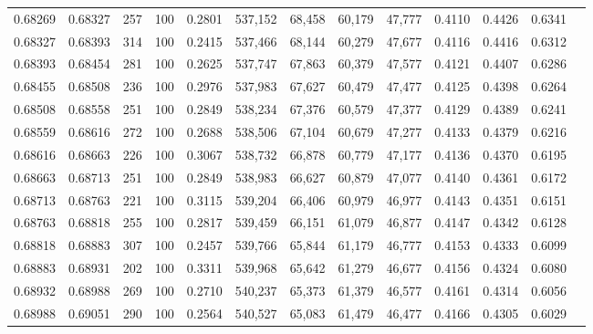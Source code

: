 \begin{tabular}{rrrrrrrrrrrrr}
0.68269 & 0.68327 &   257 & 100 &                                     0.2801 & 537,152 &  68,458 &  60,179 &  47,777 & 0.4110 & 0.4426 & 0.6341 \\
0.68327 & 0.68393 &   314 & 100 &                                     0.2415 & 537,466 &  68,144 &  60,279 &  47,677 & 0.4116 & 0.4416 & 0.6312 \\
0.68393 & 0.68454 &   281 & 100 &                                     0.2625 & 537,747 &  67,863 &  60,379 &  47,577 & 0.4121 & 0.4407 & 0.6286 \\
0.68455 & 0.68508 &   236 & 100 &                                     0.2976 & 537,983 &  67,627 &  60,479 &  47,477 & 0.4125 & 0.4398 & 0.6264 \\
0.68508 & 0.68558 &   251 & 100 &                                     0.2849 & 538,234 &  67,376 &  60,579 &  47,377 & 0.4129 & 0.4389 & 0.6241 \\
0.68559 & 0.68616 &   272 & 100 &                                     0.2688 & 538,506 &  67,104 &  60,679 &  47,277 & 0.4133 & 0.4379 & 0.6216 \\
0.68616 & 0.68663 &   226 & 100 &                                     0.3067 & 538,732 &  66,878 &  60,779 &  47,177 & 0.4136 & 0.4370 & 0.6195 \\
0.68663 & 0.68713 &   251 & 100 &                                     0.2849 & 538,983 &  66,627 &  60,879 &  47,077 & 0.4140 & 0.4361 & 0.6172 \\
0.68713 & 0.68763 &   221 & 100 &                                     0.3115 & 539,204 &  66,406 &  60,979 &  46,977 & 0.4143 & 0.4351 & 0.6151 \\
0.68763 & 0.68818 &   255 & 100 &                                     0.2817 & 539,459 &  66,151 &  61,079 &  46,877 & 0.4147 & 0.4342 & 0.6128 \\
0.68818 & 0.68883 &   307 & 100 &                                     0.2457 & 539,766 &  65,844 &  61,179 &  46,777 & 0.4153 & 0.4333 & 0.6099 \\
0.68883 & 0.68931 &   202 & 100 &                                     0.3311 & 539,968 &  65,642 &  61,279 &  46,677 & 0.4156 & 0.4324 & 0.6080 \\
0.68932 & 0.68988 &   269 & 100 &                                     0.2710 & 540,237 &  65,373 &  61,379 &  46,577 & 0.4161 & 0.4314 & 0.6056 \\
0.68988 & 0.69051 &   290 & 100 &                                     0.2564 & 540,527 &  65,083 &  61,479 &  46,477 & 0.4166 & 0.4305 & 0.6029 \\

\end{tabular}
